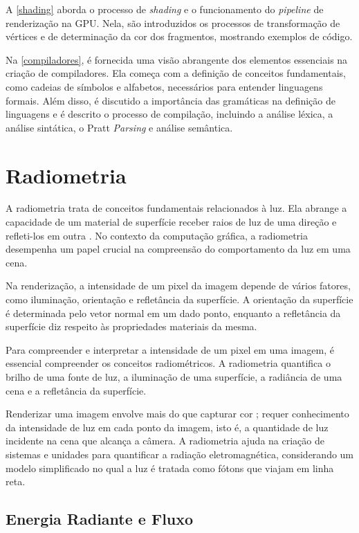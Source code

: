\documentclass[english, 
               brazil, 
               bsc] %
               {dcomp-abntex2}
\begin{document}
A \autoref{shading} aborda o processo de \textit{shading} e o funcionamento do \textit{pipeline} de renderização na GPU. Nela, são introduzidos os processos de transformação de vértices e de determinação da cor dos fragmentos, mostrando exemplos de código. 

Na \autoref{compiladores}, é fornecida uma visão abrangente dos elementos essenciais na criação de compiladores. Ela começa com a definição de conceitos fundamentais, como cadeias de símbolos e alfabetos, necessários para entender linguagens formais. Além disso, é discutido a importância das gramáticas na definição de linguagens e é descrito o processo de compilação, incluindo a análise léxica, a análise sintática, o Pratt \textit{Parsing} e análise semântica.



\section{Radiometria} \label{radiometria}

A radiometria trata de conceitos fundamentais relacionados à luz. Ela abrange a capacidade de um material de superfície receber raios de luz de uma direção e refleti-los em outra 
\cite{radiometry_introduction}. No contexto da computação gráfica, a radiometria desempenha um papel crucial na compreensão do comportamento da luz em uma cena.

Na renderização, a intensidade de um pixel da imagem depende de vários fatores, como iluminação, orientação e refletância da superfície. A orientação da superfície é determinada pelo vetor normal em um dado ponto, enquanto a refletância da superfície diz respeito às propriedades materiais da mesma.

Para compreender e interpretar a intensidade de um pixel em uma imagem, é essencial compreender os conceitos radiométricos. A radiometria quantifica o brilho de uma fonte de luz, a iluminação de uma superfície, a radiância de uma cena e a refletância da superfície.

Renderizar uma imagem envolve mais do que capturar cor \cite{radiometry_color}; requer conhecimento da intensidade de luz em cada ponto da imagem, isto é, a quantidade de luz incidente na cena que alcança a câmera. A radiometria ajuda na criação de sistemas e unidades para quantificar a radiação eletromagnética, considerando um modelo simplificado no qual a luz é tratada como fótons que viajam em linha reta. 

\subsection{Energia Radiante e Fluxo} \label{fluxo}
\end{document}
